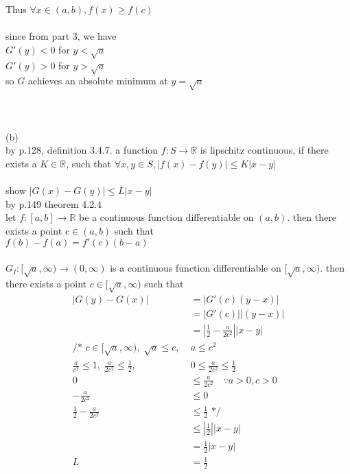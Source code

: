 \documentclass[12pt, border = 4pt, multi]{article} %
\begin{document}
Thus $\forall x \in (a,b), f(x) \geq f(c)$\\
\\
since from part 3, we have\\
$G'(y) < 0$ for $y < \sqrt{a}$\\
$G'(y) > 0$ for $y > \sqrt{a}$\\
so $G$ achieves an absolute minimum at $y = \sqrt{a}$\\
\\
\\
\\
(b)\\
by p.128, definition 3.4.7. a function $f: S \rightarrow \mathbb{R}$ is lipschitz continuous, if there exists a $K \in \mathbb{R}$, such that
$\forall x, y \in S, |f(x) - f(y)| \leq K|x - y|$\\
\\
show $|G(x) - G(y)| \leq L|x - y|$\\
by p.149 theorem 4.2.4\\
let $f: [a, b] \rightarrow \mathbb{R}$ be a continuous function differentiable on
$(a, b)$. then there exists a point $c \in (a, b)$ such that\\
$f(b) - f(a) = f'(c)(b - a)$\\
\\
$G_I: [\sqrt{a}, \infty) \rightarrow (0, \infty)$ is a continuous function differentiable on $[\sqrt{a}, \infty)$. then there exists a point $c \in [\sqrt{a}, \infty)$ such that
\begin{align*}
|G(y) - G(x)| &= |G'(c)(y - x)|\\
&= |G'(c)||(y - x)|\\
&= \left|\frac{1}{2} - \frac{a}{2c ^ 2}\right||x - y|\\
\text{/* } c \in [\sqrt{a}, \infty),\; \sqrt{a} \leq c,\; &a \leq c ^ 2\\
\frac{a}{c ^ 2} \leq 1,\; \frac{a}{2c ^ 2} \leq \frac{1}{2},\; &0 \leq \frac{a}{2c ^ 2} \leq \frac{1}{2}\\
0 &\leq \frac{a}{2c ^ 2} \quad \because a > 0, c > 0\\
-\frac{a}{2c ^ 2} &\leq 0\\
\frac{1}{2} -\frac{a}{2c ^ 2} &\leq \frac{1}{2} \text{ */}\\
&\leq \left|\frac{1}{2}\right||x - y|\\
&= \frac{1}{2}|x - y|\\
L &= \frac{1}{2}
\end{align*}
\\
\\
\end{document}
